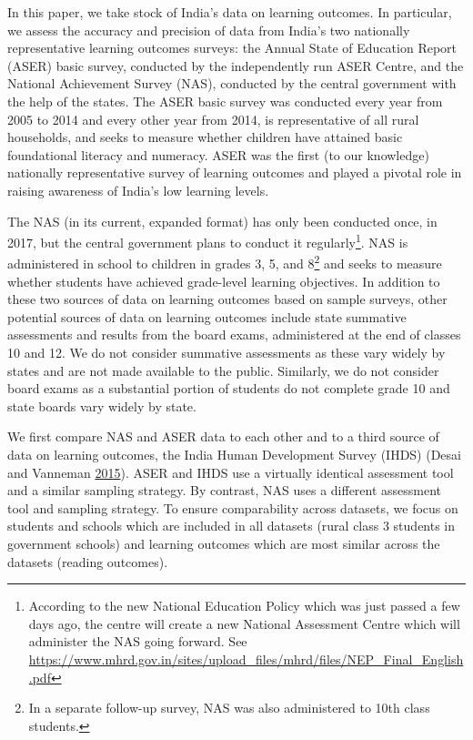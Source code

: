 \documentclass[
  11pt,
]{article}
\begin{document}
In this paper, we take stock of India's data on learning outcomes. In particular, we assess the accuracy and precision of data from India's two nationally representative learning outcomes surveys: the Annual State of Education Report (ASER) basic survey, conducted by the independently run ASER Centre, and the National Achievement Survey (NAS), conducted by the central government with the help of the states. The ASER basic survey was conducted every year from 2005 to 2014 and every other year from 2014, is representative of all rural households, and seeks to measure whether children have attained basic foundational literacy and numeracy. ASER was the first (to our knowledge) nationally representative survey of learning outcomes and played a pivotal role in raising awareness of India's low learning levels.

The NAS (in its current, expanded format) has only been conducted once, in 2017, but the central government plans to conduct it regularly\footnote{According to the new National Education Policy which was just passed a few days ago, the centre will create a new National Assessment Centre which will administer the NAS going forward. See \url{https://www.mhrd.gov.in/sites/upload_files/mhrd/files/NEP_Final_English.pdf}}. NAS is administered in school to children in grades 3, 5, and 8\footnote{In a separate follow-up survey, NAS was also administered to 10th class students.} and seeks to measure whether students have achieved grade-level learning objectives. In addition to these two sources of data on learning outcomes based on sample surveys, other potential sources of data on learning outcomes include state summative assessments and results from the board exams, administered at the end of classes 10 and 12. We do not consider summative assessments as these vary widely by states and are not made available to the public. Similarly, we do not consider board exams as a substantial portion of students do not complete grade 10 and state boards vary widely by state.

We first compare NAS and ASER data to each other and to a third source of data on learning outcomes, the India Human Development Survey (IHDS) (Desai and Vanneman \protect\hyperlink{ref-desai2015india}{2015}). ASER and IHDS use a virtually identical assessment tool and a similar sampling strategy. By contrast, NAS uses a different assessment tool and sampling strategy. To ensure comparability across datasets, we focus on students and schools which are included in all datasets (rural class 3 students in government schools) and learning outcomes which are most similar across the datasets (reading outcomes).
\end{document}

